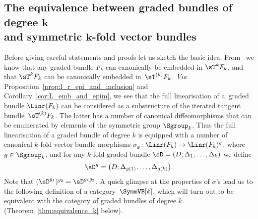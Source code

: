 \subsection[The equivalence between graded bundles of degree $k$ and symmetric $k$-fold vector bundles]{The equivalence between graded bundles of degree $\boldsymbol{k}$\\ and symmetric $\boldsymbol{k}$-fold vector bundles}

Before giving careful statements and proofs let us sketch the basic idea. From~\cite{JG_MR_higher_vb} we know that any graded bundle $F_{k}$ can canonically be embedded in $\sT^{k}F_{k}$, and that $\sT^{k}F_{k}$ can be canonically embedded in~$\sT^{(k)}F_{k}$. \emph{Via} Proposition~\ref{prop:l_r_epi_and_inclusion} and Corollary~\ref{cor:L_emb_and_epim}, we see that the full linearisation of a~graded bundle $\Linr(F_{k})$ can be considered as a substructure of the iterated tangent bundle~$\sT^{(k)}F_{k}$. The latter has a number of canonical dif\/feomorphisms that can be enumerated by elements of the symmetric group $\Sgroup_{k}$. Thus the full linearisation of a graded bundle of degree $k$ is equipped with a number of canonical $k$-fold vector bundle morphisms $\sigma_{g}\colon \Linr(F_{k}) \rightarrow \Linr(F_{k})^{g}$, where $g \in \Sgroup_{k}$, and for any $k$-fold graded bundle $\sD =(D; \Delta_1, \ldots, \Delta_k)$ we def\/ine
\begin{gather*}\sD^g =\big(D; \Delta_{g(1)}, \ldots, \Delta_{g(k)}\big).
\end{gather*}
Note that $(\sD^{g_1})^{g_2} = \sD^{g_1g_2}$. A quick glimpse at the properties of $\sigma$'s lead us to the following def\/inition of a category~$\SymmVB[k]$, which will turn out to be equivalent with the category of graded bundles of degree $k$ (Theorem~\ref{thm:equivalence_k} below).


